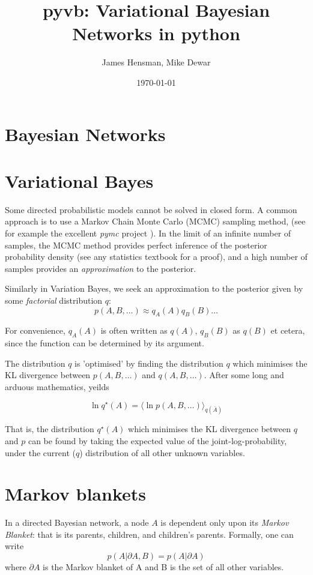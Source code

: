 \documentclass{article}
\title{pyvb: Variational Bayesian Networks in python}
\author{James Hensman, Mike Dewar}
\date{\today}
\newcommand{\qs}{q^\star}
\newcommand{\<}{\langle}
\renewcommand{\>}{\rangle}
\begin{document}
\maketitle

\section{Bayesian Networks}

\section{Variational Bayes}
Some directed probabilistic models cannot be solved in closed form. A common approach is to use a Markov Chain Monte Carlo (MCMC) sampling method, (see for example the excellent {\em pymc} project \cite{pymc}).  In the limit of an infinite number of samples, the MCMC method provides perfect inference of the posterior probability density (see any statistics textbook for a proof), and a high number of samples provides an {\em approximation} to the posterior.  

Similarly in Variation Bayes, we seek an approximation to the posterior given by some {\em factorial} distribution $q$:
\begin{equation}
p(A,B,\ldots) \approx q_A(A) q_B(B) \ldots
\end{equation}

For convenience, $q_A(A)$ is often written as $q(A)$, $q_B(B)$ as $q(B)$ et cetera, since the function can be determined by its argument. 

The distribution $q$ is 'optimised' by finding the distribution $q$ which minimises the KL divergence between $p(A,B,\ldots)$ and $q(A,B,\ldots)$.  After some long and arduous mathematics, \citet{Bishop2006prm} yeilds

\begin{equation}
\ln \qs(A) = \< \ln p(A,B,\ldots)\>_{q(\bar A)}
\label{eq:VB_update}
\end{equation}

That is, the distribution $\qs(A)$ which minimises the KL divergence between $q$ and $p$ can be found by taking the expected value of the joint-log-probability, under the current ($q$) distribution of all other unknown variables. 

\section{Markov blankets}
In a directed Bayesian network, a node $A$ is dependent only upon its {\em Markov Blanket}: that is its parents, children, and children's parents. Formally, one can write
\begin{equation}
p(A|\partial A,B) = p(A | \partial A)
\end{equation}
where $\partial A$ is the Markov blanket of A and B is the set of all other variables.   
\end{document}
